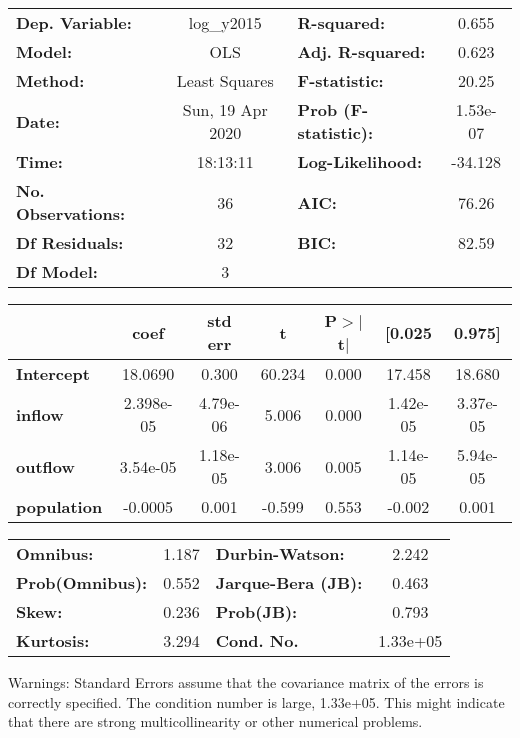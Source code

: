 \begin{center}
\begin{tabular}{lclc}
\toprule
\textbf{Dep. Variable:}    &    log\_y2015    & \textbf{  R-squared:         } &     0.655   \\
\textbf{Model:}            &       OLS        & \textbf{  Adj. R-squared:    } &     0.623   \\
\textbf{Method:}           &  Least Squares   & \textbf{  F-statistic:       } &     20.25   \\
\textbf{Date:}             & Sun, 19 Apr 2020 & \textbf{  Prob (F-statistic):} &  1.53e-07   \\
\textbf{Time:}             &     18:13:11     & \textbf{  Log-Likelihood:    } &   -34.128   \\
\textbf{No. Observations:} &          36      & \textbf{  AIC:               } &     76.26   \\
\textbf{Df Residuals:}     &          32      & \textbf{  BIC:               } &     82.59   \\
\textbf{Df Model:}         &           3      & \textbf{                     } &             \\
\bottomrule
\end{tabular}
\begin{tabular}{lcccccc}
                    & \textbf{coef} & \textbf{std err} & \textbf{t} & \textbf{P$> |$t$|$} & \textbf{[0.025} & \textbf{0.975]}  \\
\midrule
\textbf{Intercept}  &      18.0690  &        0.300     &    60.234  &         0.000        &       17.458    &       18.680     \\
\textbf{inflow}     &    2.398e-05  &     4.79e-06     &     5.006  &         0.000        &     1.42e-05    &     3.37e-05     \\
\textbf{outflow}    &     3.54e-05  &     1.18e-05     &     3.006  &         0.005        &     1.14e-05    &     5.94e-05     \\
\textbf{population} &      -0.0005  &        0.001     &    -0.599  &         0.553        &       -0.002    &        0.001     \\
\bottomrule
\end{tabular}
\begin{tabular}{lclc}
\textbf{Omnibus:}       &  1.187 & \textbf{  Durbin-Watson:     } &    2.242  \\
\textbf{Prob(Omnibus):} &  0.552 & \textbf{  Jarque-Bera (JB):  } &    0.463  \\
\textbf{Skew:}          &  0.236 & \textbf{  Prob(JB):          } &    0.793  \\
\textbf{Kurtosis:}      &  3.294 & \textbf{  Cond. No.          } & 1.33e+05  \\
\bottomrule
\end{tabular}
\end{center}

Warnings: \newline
 [1] Standard Errors assume that the covariance matrix of the errors is correctly specified. \newline
 [2] The condition number is large, 1.33e+05. This might indicate that there are \newline
 strong multicollinearity or other numerical problems.